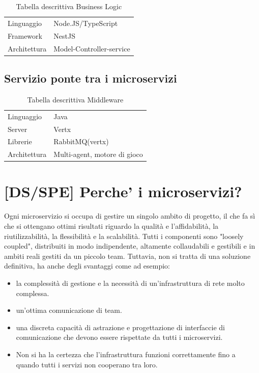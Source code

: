 \begin{table}[h!]
    \centering
    \caption{Tabella descrittiva Business Logic}
    \label{tab:bl_serv_table}
    \begin{tabular}{ll}     
        \toprule                   
        Linguaggio & Node.JS/TypeScript \\        
        Framework & NestJS   \\                   
        Architettura & Model-Controller-service  \\
        \bottomrule
    \end{tabular}
\end{table}

\subsection{Servizio ponte tra i microservizi}


\begin{table}[h!]
    \centering
    \caption{Tabella descrittiva Middleware}
    \label{tab:middleware_serv_table}
    \begin{tabular}{ll}     
        \toprule                   
        Linguaggio & Java \\        
        Server & Vertx \\
        Librerie & RabbitMQ(vertx) \\
        Architettura & Multi-agent, motore di gioco \\
        \bottomrule
    \end{tabular}
\end{table}

\section{[DS/SPE] Perche' i microservizi?}

Ogni microservizio si occupa di gestire un singolo ambito di progetto, il che fa sì che si ottengano ottimi risultati riguardo la qualità e l'affidabilità, la riutilizzabilità, la flessibilità e la scalabilità.
Tutti i componenti sono "loosely coupled", distribuiti in modo indipendente, altamente collaudabili e gestibili e in ambiti reali gestiti da un piccolo team.
Tuttavia, non si tratta di una soluzione definitiva, ha anche degli svantaggi come ad esempio:
\begin{itemize}
    \item la complessità di gestione e la necessità di un'infrastruttura di rete molto complessa.
    \item un'ottima comunicazione di team.
    \item una discreta capacità di astrazione e progettazione di interfaccie di comunicazione che devono essere rispettate da tutti i microservizi.
    \item Non si ha la certezza che l'infrastruttura funzioni correttamente fino a quando tutti i servizi non cooperano tra loro.
\end{itemize}

